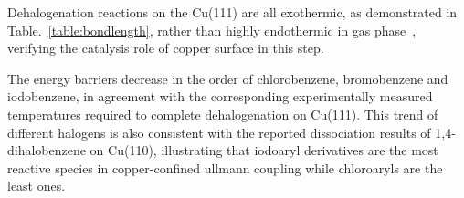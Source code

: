 \documentclass[%
 reprint,
 amsmath,amssymb,
 aps,
prb,
floatfix,
]{revtex4-2}
\newcommand{\lock}{\color{red}}
\newcommand{\zhzh}{\color{blue}}
\newcommand{\lock}{\color{red}}
\newcommand{\zhzh}{\color{blue}}
\begin{document}
{\zhzh





Dehalogenation reactions on the Cu(111) are all exothermic, as demonstrated in Table.~\ref{table:bondlength}, rather than highly endothermic in gas phase~\cite{jacs2013}, verifying the catalysis role of copper surface in this step.


The energy barriers decrease in the order of chlorobenzene, bromobenzene and iodobenzene, in agreement with the corresponding experimentally measured temperatures required to complete dehalogenation on Cu(111). This trend of different halogens is also consistent with the reported dissociation results of 1,4-dihalobenzene on Cu(110)\cite{ullmann_52}, illustrating that iodoaryl derivatives are the most reactive species in copper-confined ullmann coupling while chloroaryls are the least ones. 


}
\end{document}
